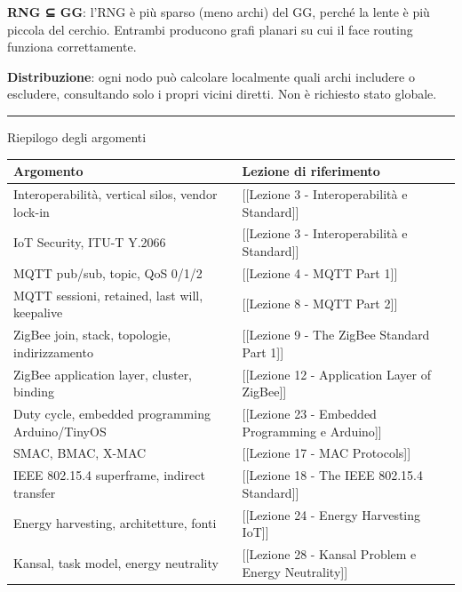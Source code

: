 \documentclass[
  italian,
  openany]{book}
\newcounter{none} %
\begin{document}
\textbf{RNG ⊆ GG}: l'RNG è più sparso (meno archi) del GG, perché la
lente è più piccola del cerchio. Entrambi producono grafi planari su cui
il face routing funziona correttamente.

\textbf{Distribuzione}: ogni nodo può calcolare localmente quali archi
includere o escludere, consultando solo i propri vicini diretti. Non è
richiesto stato globale.

\begin{center}\rule{0.5\linewidth}{0.5pt}\end{center}

\begin{calloutnote}{Riepilogo degli argomenti}

{\def\LTcaptype{none} %
\begin{longtable}[]{@{}
  >{\raggedright\arraybackslash}p{}
  >{\raggedright\arraybackslash}p{}@{}}
\toprule\noalign{}
\begin{minipage}[b]{\linewidth}\raggedright
Argomento
\end{minipage} & \begin{minipage}[b]{\linewidth}\raggedright
Lezione di riferimento
\end{minipage} \\
\midrule\noalign{}
\endhead
\bottomrule\noalign{}
\endlastfoot
Interoperabilità, vertical silos, vendor lock-in & {[}{[}Lezione 3 -
Interoperabilità e Standard{]}{]} \\
IoT Security, ITU-T Y.2066 & {[}{[}Lezione 3 - Interoperabilità e
Standard{]}{]} \\
MQTT pub/sub, topic, QoS 0/1/2 & {[}{[}Lezione 4 - MQTT Part 1{]}{]} \\
MQTT sessioni, retained, last will, keepalive & {[}{[}Lezione 8 - MQTT
Part 2{]}{]} \\
ZigBee join, stack, topologie, indirizzamento & {[}{[}Lezione 9 - The
ZigBee Standard Part 1{]}{]} \\
ZigBee application layer, cluster, binding & {[}{[}Lezione 12 -
Application Layer of ZigBee{]}{]} \\
Duty cycle, embedded programming Arduino/TinyOS & {[}{[}Lezione 23 -
Embedded Programming e Arduino{]}{]} \\
SMAC, BMAC, X-MAC & {[}{[}Lezione 17 - MAC Protocols{]}{]} \\
IEEE 802.15.4 superframe, indirect transfer & {[}{[}Lezione 18 - The
IEEE 802.15.4 Standard{]}{]} \\
Energy harvesting, architetture, fonti & {[}{[}Lezione 24 - Energy
Harvesting IoT{]}{]} \\
Kansal, task model, energy neutrality & {[}{[}Lezione 28 - Kansal
Problem e Energy Neutrality{]}{]} \\
\end{longtable}
}

\end{calloutnote}
\end{document}
